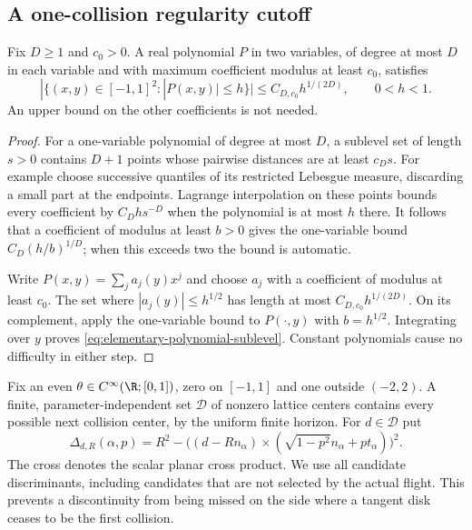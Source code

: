 \subsection{A one-collision regularity cutoff}
\begin{lemma}
\label{lem:elementary-polynomial-sublevel}
Fix $D\ge1$ and $c_0>0$. A real polynomial $P$ in two variables, of
degree at most $D$ in each variable and with maximum coefficient
modulus at least $c_0$, satisfies
\begin{equation}\label{eq:elementary-polynomial-sublevel}
 |\{(x,y)\in[-1,1]^2:|P(x,y)|\le h\}|
                  \le C_{D,c_0}h^{1/(2D)},\qquad 0<h<1.
\end{equation}
An upper bound on the other coefficients is not needed.
\end{lemma}
\begin{proof}
For a one-variable polynomial of degree at most $D$, a sublevel set of
length $s>0$ contains $D+1$ points whose pairwise distances are at least
$c_Ds$. For example choose successive quantiles of its restricted
Lebesgue measure, discarding a small part at the endpoints. Lagrange
interpolation on these points bounds every coefficient by $C_D h s^{-D}$
when the polynomial is at most $h$ there. It follows that a coefficient
of modulus at least $b>0$ gives the one-variable bound
$C_D(h/b)^{1/D}$; when this exceeds two the bound is automatic.

Write $P(x,y)=\sum_j a_j(y)x^j$ and choose $a_j$ with a coefficient
of modulus at least $c_0$. The set where $|a_j(y)|\le h^{1/2}$ has
length at most $C_{D,c_0}h^{1/(2D)}$. On its complement, apply the
one-variable bound to $P(\cdot,y)$ with $b=h^{1/2}$. Integrating over
$y$ proves \eqref{eq:elementary-polynomial-sublevel}. Constant
polynomials cause no difficulty in either step.
\end{proof}

Fix an even $\theta\in C^\infty(\R;[0,1])$, zero on $[-1,1]$ and one
outside $(-2,2)$. A finite, parameter-independent set $\mathcal D$ of
nonzero lattice centers contains every possible next collision center,
by the uniform finite horizon. For $d\in\mathcal D$ put
\begin{equation}\label{eq:all-candidate-discriminants}
 \Delta_{d,R}(\alpha,p)
   =R^2-\bigl((d-Rn_\alpha)\mathbin{\times}
          (\sqrt{1-p^2}n_\alpha+pt_\alpha)\bigr)^2.
\end{equation}
The cross denotes the scalar planar cross product. We use all candidate
discriminants, including candidates that are not selected by the actual
flight. This prevents a discontinuity from being missed on the side
where a tangent disk ceases to be the first collision.

